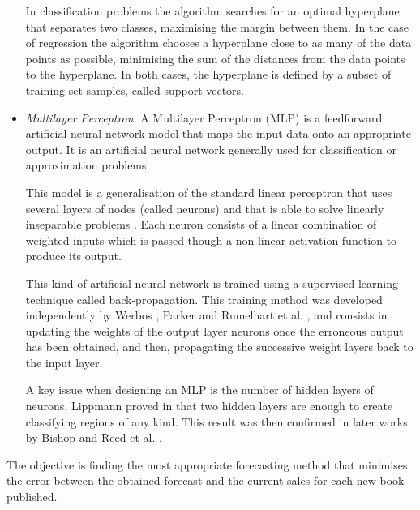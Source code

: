 \documentclass[a4paper,10pt,twocolumn,preprint,3p]{elsarticle}
\begin{document}
\begin{itemize}
In classification problems the algorithm searches for an optimal hyperplane 
that separates two classes, maximising the margin between them. 
In the case of regression the algorithm chooses a hyperplane close to as many 
of the data points as possible, minimising the sum of the distances from 
the data points to the hyperplane. 
In both cases, the hyperplane is defined by a subset of training set samples, 
called support vectors.



 \item \emph{Multilayer Perceptron}:
A Multilayer Perceptron (MLP) \cite{Rosenblatt1962,Widrow1990} is a feedforward 
artificial neural network model that maps the input data onto an appropriate output. 
It is an artificial neural network generally used for classification or 
approximation problems.

This model is a generalisation of the standard linear perceptron that uses several 
layers of nodes (called neurons) and that is able to solve linearly inseparable 
problems \cite{SteinwenderBitzer2003}.
Each neuron consists of a linear combination of weighted inputs which is passed 
though a non-linear activation function to produce its output.

This kind of artificial neural network is trained using a supervised learning 
technique called back-propagation.
This training method was developed independently by Werbos \cite{Werbos1974}, 
Parker \cite{Parker1985} and Rumelhart et al. \cite{Rumelhart1985}, and consists
in updating the weights of the output layer neurons once the erroneous output 
has been obtained, and then, propagating the successive weight layers back to 
the input layer.

A key issue when designing an MLP is the number of hidden layers of neurons.
Lippmann proved in \cite{Lippmann1987} that two hidden layers are enough to 
create classifying regions of any kind. This result was then confirmed in later 
works by Bishop \cite{Bishop1996} and Reed et al. \cite{Reed1999}.

\end{itemize}

The objective is finding the most appropriate forecasting method that minimises 
the error between the obtained forecast and the current sales for each new book 
published.
\end{document}
